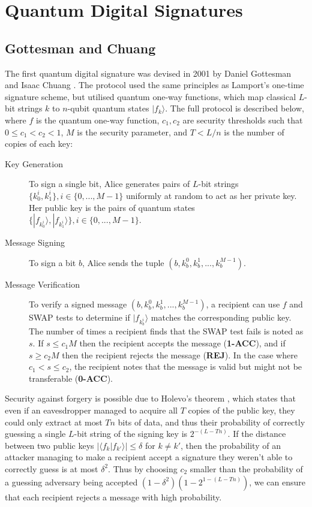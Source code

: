 \documentclass[%
 reprint,
 amsmath,amssymb,
 aps,
 pra,
]{revtex4-1}
\begin{document}
\section{Quantum Digital Signatures}
\label{sec:qds}

\subsection{Gottesman and Chuang}

The first quantum digital signature was devised in 2001 by Daniel Gottesman and Isaac Chuang \citep{quant-ph/0105032}. The protocol used the same principles as Lamport's one-time signature scheme, but utilised quantum one-way functions, which map classical $L$-bit strings $k$ to $n$-qubit quantum states $|f_k\rangle$. The full protocol is described below, where $f$ is the quantum one-way function, $c_1, c_2$ are security thresholds such that $0 \leq c_1 < c_2 < 1$, $M$ is the security parameter, and $T < L/n$ is the number of copies of each key:

\begin{description}
\item[Key Generation]To sign a single bit, Alice generates pairs of $L$-bit strings $\{k^i_0, k^i_1\}, i \in \{0,...,M-1\}$ uniformly at random to act as her private key. Her public key is the pairs of quantum states $\{|f_{k^i_0}\rangle, |f_{k^i_1}\rangle\}, i \in \{0,...,M-1\}$.
\item[Message Signing]To sign a bit $b$, Alice sends the tuple $(b, k^0_b, k^1_b,...,k^{M-1}_b)$.
\item[Message Verification]To verify a signed message $(b, k^0_b, k^1_b,...,k^{M-1}_b)$, a recipient can use $f$ and SWAP tests \cite{PhysRevLett.87.167902} to determine if $|f_{k^i_b}\rangle$ matches the corresponding public key. The number of times a recipient finds that the SWAP test fails is noted as $s$. If $s \leq c_1M$ then the recipient accepts the message (\textbf{1-ACC}), and if $s \geq c_2M$ then the recipient rejects the message (\textbf{REJ}). In the case where $c_1 < s \leq c_2$, the recipient notes that the message is valid but might not be transferable (\textbf{0-ACC}).
\end{description}

Security against forgery is possible due to Holevo's theorem \cite{Hol73}, which states that even if an eavesdropper managed to acquire all $T$ copies of the public key, they could only extract at most $Tn$ bits of data, and thus their probability of correctly guessing a single $L$-bit string of the signing key is $2^{-(L-Tn)}$. If the distance between two public keys $|\langle f_k|f_{k'}\rangle| \leq \delta$ for $k \neq k'$, then the probability of an attacker managing to make a recipient accept a signature they weren't able to correctly guess is at most $\delta^2$. Thus by choosing $c_2$ smaller than the probability of a guessing adversary being accepted $(1 - \delta^2)(1 - 2^{1 - (L-Tn)})$, we can ensure that each recipient rejects a message with high probability.
\end{document}
